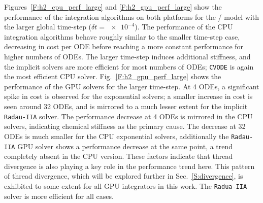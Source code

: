 \documentclass[final,twocolumn]{elsarticle}
\begin{document}
Figures~\ref{F:h2_cpu_perf_large} and \ref{F:h2_gpu_perf_large} show the performance of the integration algorithms on both platforms for the \slash{} model with the larger global time-step ($\delta t=\num{e-4}$).
The performance of the CPU integration algorithms behave roughly similar to the smaller time-step case, decreasing in cost per ODE before reaching a more constant performance for higher numbers of ODEs.
The larger time-step induces additional stiffness, and the implicit solvers are more efficient for most numbers of ODEs; \texttt{CVODE} is again the most efficient CPU solver.
Fig.~\ref{F:h2_gpu_perf_large} shows the performance of the GPU solvers for the larger time-step.
At \num{4} ODEs, a significant spike in cost is observed for the exponential solvers; a smaller increase in cost is seen around \num{32} ODEs, and is mirrored to a much lesser extent for the implicit \texttt{Radau-IIA} solver.
The performance decrease at \num{4} ODEs is mirrored in the CPU solvers, indicating chemical stiffness as the primary cause.
The decrease at \num{32} ODEs is much smaller for the CPU exponential solvers, additionally the \texttt{Radau-IIA} GPU solver shows a performance decrease at the same point, a trend completely absent in the CPU version.
These factors indicate that thread divergence is also playing a key role in the performance trend here.
This pattern of thread divergence, which will be explored further in Sec.~\ref{S:divergence}, is exhibited to some extent for all GPU integrators in this work.
The \texttt{Radua-IIA} solver is more efficient for all cases.
\end{document}
